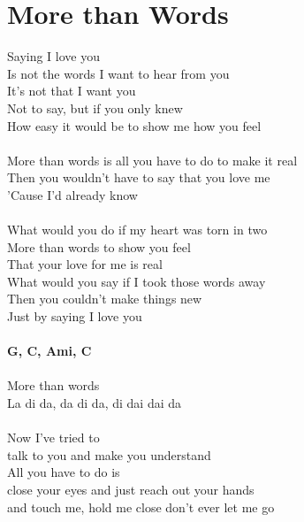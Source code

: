 \section{More than Words}
Saying I love you\\
Is not the words I want to hear from you\\
It's not that I want you\\
Not to say, but if you only knew\\
How easy it would be to show me how you feel \\
\\
More than words is all you have to do to make it real \\
Then you wouldn't have to say that you love me \\
'Cause I'd already know \\
\\
What would you do if my heart was torn in two \\
More than words to show you feel \\
That your love for me is real \\
What would you say if I took those words away \\
Then you couldn't make things new \\
Just by saying I love you\\
\\
\footnotesize\textbf{G, C, Ami, C}\\
\normalsize
\\
More than words \\
La di da, da di da, di dai dai da\\
\\
Now I've tried to \\
talk to you and make you understand \\
All you have to do is\\
close your eyes and just reach out your hands\\
and touch me, hold me close don't ever let me go \\
\\
